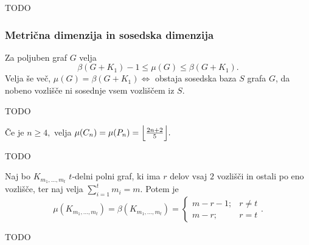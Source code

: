 \documentclass[mat1, tisk]{fmfdelo}
\newcommand{\1}{(1, 1, ..., 1)}
\newcommand{\2}{(2, 2, ..., 2)}
\begin{document}
\begin{dokaz}
    TODO
\end{dokaz}



\subsubsection{Metrična dimenzija in sosedska dimenzija}

\begin{trditev}
    Za poljuben graf $G$ velja
    $$\beta(G + K_1) - 1 \leq \mu(G) \leq \beta(G + K_1).$$
    Velja še več, 
    $\mu(G) = \beta(G + K_1) \Leftrightarrow$ obstaja sosedska baza $S$ grafa $G$, 
    da nobeno vozlišče ni sosednje vsem vozliščem iz $S$.
\end{trditev}

\begin{dokaz}
    TODO
\end{dokaz}


\begin{trditev}
    Če je $n \geq 4,$ velja $\mu(C_n) = \mu(P_n) = \Bigl \lfloor \frac{2n + 2}{5}\Bigr \rfloor. $
\end{trditev}

\begin{dokaz}
    TODO
\end{dokaz}


\begin{trditev}
    Naj bo $K_{m_1, ..., m_t}$ $t$-delni polni graf, ki ima $r$ delov vsaj $2$ vozlišči in ostali 
    po eno vozlišče, ter naj velja $\sum_{i=1}^{t} m_i = m.$ Potem je
    $$\mu(K_{m_1, ..., m_t}) = \beta(K_{m_1, ..., m_t}) = 
    \begin{cases}
        m - r - 1; & r \neq t \\
        m - r; & r = t 
    \end{cases}.$$
\end{trditev}

\begin{dokaz}
    TODO
\end{dokaz}



\end{document}
